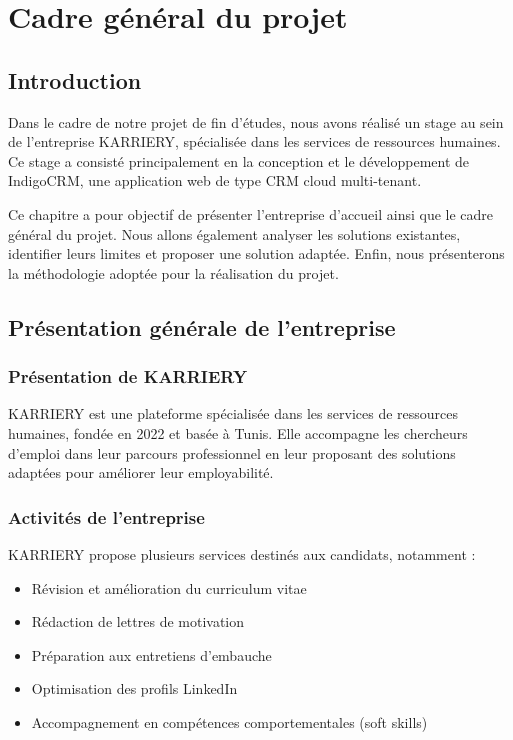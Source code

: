 \documentclass[12pt,a4paper,twoside,openany]{book}
\begin{document}
\justifying

\tableofcontents
\clearpage

\chapter{Cadre général du projet}

\section{Introduction}

Dans le cadre de notre projet de fin d’études, nous avons réalisé un stage au sein de l’entreprise KARRIERY, spécialisée dans les services de ressources humaines. Ce stage a consisté principalement en la conception et le développement de IndigoCRM, une application web de type CRM cloud multi-tenant.

Ce chapitre a pour objectif de présenter l’entreprise d’accueil ainsi que le cadre général du projet. Nous allons également analyser les solutions existantes, identifier leurs limites et proposer une solution adaptée. Enfin, nous présenterons la méthodologie adoptée pour la réalisation du projet.

\section{Présentation générale de l’entreprise}

\subsection{Présentation de KARRIERY}

KARRIERY est une plateforme spécialisée dans les services de ressources humaines, fondée en 2022 et basée à Tunis. Elle accompagne les chercheurs d’emploi dans leur parcours professionnel en leur proposant des solutions adaptées pour améliorer leur employabilité.

\subsection{Activités de l’entreprise}

KARRIERY propose plusieurs services destinés aux candidats, notamment :

\begin{itemize}
\item Révision et amélioration du curriculum vitae
\item Rédaction de lettres de motivation
\item Préparation aux entretiens d’embauche
\item Optimisation des profils LinkedIn
\item Accompagnement en compétences comportementales (soft skills)
\end{itemize}
\end{document}
